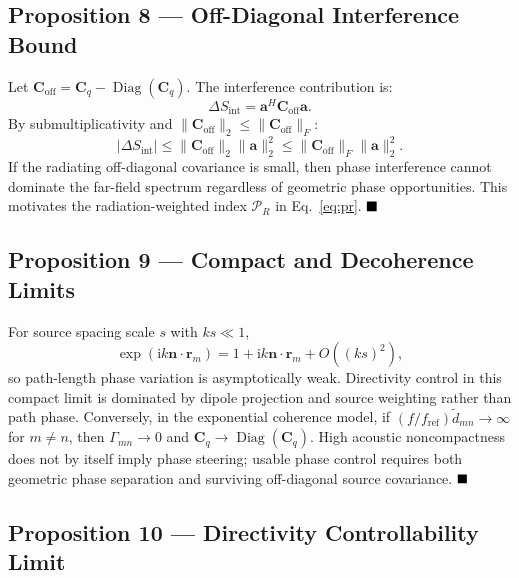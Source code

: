 \documentclass[11pt]{article}
\newcommand{\ii}{\mathrm{i}}
\newcommand{\vect}[1]{\bm{#1}}
\newcommand{\mat}[1]{\bm{#1}}
\begin{document}
\subsection{Proposition 8 --- Off-Diagonal Interference Bound}

Let $\mat{C}_{\mathrm{off}}=\mat{C}_q-\operatorname{Diag}(\mat{C}_q)$. The interference contribution is:
\begin{equation*}
    \Delta S_{\mathrm{int}}
    =
    \vect{a}^{H}\mat{C}_{\mathrm{off}}\vect{a}.
\end{equation*}
By submultiplicativity and $\|\mat{C}_{\mathrm{off}}\|_2\le\|\mat{C}_{\mathrm{off}}\|_F$:
\begin{equation*}
    |\Delta S_{\mathrm{int}}|
    \le
    \|\mat{C}_{\mathrm{off}}\|_2\|\vect{a}\|_2^2
    \le
    \|\mat{C}_{\mathrm{off}}\|_F\|\vect{a}\|_2^2.
\end{equation*}
If the radiating off-diagonal covariance is small, then phase interference cannot dominate the far-field spectrum regardless of geometric phase opportunities. This motivates the radiation-weighted index $\mathcal P_R$ in Eq.~\ref{eq:pr}. $\hfill \blacksquare$

\subsection{Proposition 9 --- Compact and Decoherence Limits}

For source spacing scale $s$ with $ks\ll1$,
\begin{equation*}
    \exp(\ii k\vect{n}\cdot\vect{r}_m)
    =
    1+\ii k\vect{n}\cdot\vect{r}_m+O((ks)^2),
\end{equation*}
so path-length phase variation is asymptotically weak. Directivity control in this compact limit is dominated by dipole projection and source weighting rather than path phase. Conversely, in the exponential coherence model, if $(f/f_{\mathrm{ref}})\tilde d_{mn}\rightarrow\infty$ for $m\neq n$, then $\Gamma_{mn}\rightarrow0$ and $\mat{C}_q\rightarrow\operatorname{Diag}(\mat{C}_q)$. High acoustic noncompactness does not by itself imply phase steering; usable phase control requires both geometric phase separation and surviving off-diagonal source covariance. $\hfill \blacksquare$

\subsection{Proposition 10 --- Directivity Controllability Limit}
\end{document}
